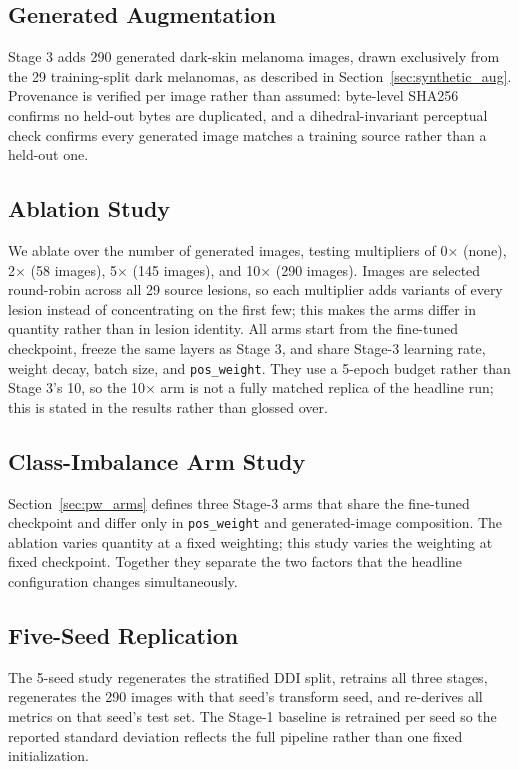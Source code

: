 \subsection{Generated Augmentation}

Stage 3 adds 290 generated dark-skin melanoma images, drawn exclusively from the 29 training-split dark melanomas, as described in Section~\ref{sec:synthetic_aug}. Provenance is verified per image rather than assumed: byte-level SHA256 confirms no held-out bytes are duplicated, and a dihedral-invariant perceptual check confirms every generated image matches a training source rather than a held-out one.

\subsection{Ablation Study}

We ablate over the number of generated images, testing multipliers of 0$\times$ (none), 2$\times$ (58 images), 5$\times$ (145 images), and 10$\times$ (290 images). Images are selected round-robin across all 29 source lesions, so each multiplier adds variants of every lesion instead of concentrating on the first few; this makes the arms differ in quantity rather than in lesion identity. All arms start from the fine-tuned checkpoint, freeze the same layers as Stage 3, and share Stage-3 learning rate, weight decay, batch size, and \texttt{pos\_weight}. They use a 5-epoch budget rather than Stage 3's 10, so the 10$\times$ arm is not a fully matched replica of the headline run; this is stated in the results rather than glossed over.

\subsection{Class-Imbalance Arm Study}

Section~\ref{sec:pw_arms} defines three Stage-3 arms that share the fine-tuned checkpoint and differ only in \texttt{pos\_weight} and generated-image composition. The ablation varies quantity at a fixed weighting; this study varies the weighting at fixed checkpoint. Together they separate the two factors that the headline configuration changes simultaneously.

\subsection{Five-Seed Replication}

The 5-seed study regenerates the stratified DDI split, retrains all three stages, regenerates the 290 images with that seed's transform seed, and re-derives all metrics on that seed's test set. The Stage-1 baseline is retrained per seed so the reported standard deviation reflects the full pipeline rather than one fixed initialization.
